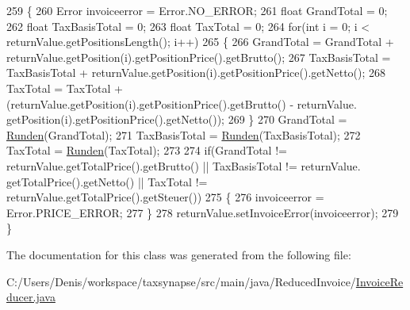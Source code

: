 \begin{DoxyCode}
259     \{
260         Error invoiceerror = Error.NO\_ERROR;
261         \textcolor{keywordtype}{float} GrandTotal = 0;
262         \textcolor{keywordtype}{float} TaxBasisTotal = 0;
263         \textcolor{keywordtype}{float} TaxTotal = 0;
264         \textcolor{keywordflow}{for}(\textcolor{keywordtype}{int} i = 0; i < returnValue.getPositionsLength(); i++)
265         \{
266             GrandTotal = GrandTotal + returnValue.getPosition(i).getPositionPrice().getBrutto();
267             TaxBasisTotal = TaxBasisTotal + returnValue.getPosition(i).getPositionPrice().getNetto();
268             TaxTotal = TaxTotal + (returnValue.getPosition(i).getPositionPrice().getBrutto() - returnValue.
      getPosition(i).getPositionPrice().getNetto());
269         \}
270         GrandTotal = \hyperlink{class_reduced_invoice_1_1_invoice_reducer_a4d9155f5cc7223ed2659a8567f9ba1ec}{Runden}(GrandTotal);
271         TaxBasisTotal = \hyperlink{class_reduced_invoice_1_1_invoice_reducer_a4d9155f5cc7223ed2659a8567f9ba1ec}{Runden}(TaxBasisTotal);
272         TaxTotal = \hyperlink{class_reduced_invoice_1_1_invoice_reducer_a4d9155f5cc7223ed2659a8567f9ba1ec}{Runden}(TaxTotal);
273         
274         \textcolor{keywordflow}{if}(GrandTotal != returnValue.getTotalPrice().getBrutto() || TaxBasisTotal != returnValue.
      getTotalPrice().getNetto() || TaxTotal != returnValue.getTotalPrice().getSteuer())
275         \{
276             invoiceerror = Error.PRICE\_ERROR;
277         \}
278         returnValue.setInvoiceError(invoiceerror);
279     \}
\end{DoxyCode}


The documentation for this class was generated from the following file\+:\begin{DoxyCompactItemize}
\item 
C\+:/\+Users/\+Denis/workspace/taxsynapse/src/main/java/\+Reduced\+Invoice/\hyperlink{_invoice_reducer_8java}{Invoice\+Reducer.\+java}\end{DoxyCompactItemize}
